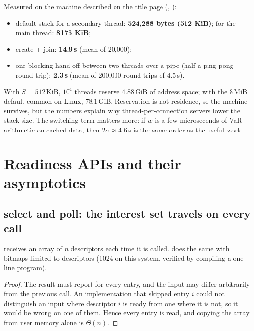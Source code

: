 \begin{verified}
Measured on the machine described on the title page (, ):
\begin{itemize}
\item default  stack for a secondary thread: \textbf{524{,}288 bytes (512 KiB)};  for the main thread: \textbf{8176 KiB};
\item {} create + join: \textbf{14.9\,\textmu s} (mean of 20{,}000);
\item one blocking hand-off between two threads over a pipe (half a ping-pong round trip): \textbf{2.3\,\textmu s} (mean of 200{,}000 round trips of 4.5\,\textmu s).
\end{itemize}
\end{verified}

With $S=512$\,KiB, $10^4$ threads reserve $4.88$\,GiB of address space; with the 8\,MiB default common on Linux, $78.1$\,GiB.
Reservation is not residence, so the machine survives, but the numbers explain why thread-per-connection servers lower
the stack size. The switching term matters more: if $w$ is a few microseconds of VaR arithmetic on cached data, then
$2\sigma\approx 4.6$\,\textmu s is the same order as the useful work.

\section{Readiness APIs and their asymptotics}
\subsection{select and poll: the interest set travels on every call}
 receives an array of $n$ descriptors each time it is called.  does the same with
bitmaps limited to  descriptors (1024 on this system, verified by compiling a one-line program).

\begin{proof}
The result must report  for every entry, and the input may differ arbitrarily from the previous call. An
implementation that skipped entry $i$ could not distinguish an input where descriptor $i$ is ready from one where it is
not, so it would be wrong on one of them. Hence every entry is read, and copying the array from user memory alone is $\Theta(n)$.
\end{proof}

